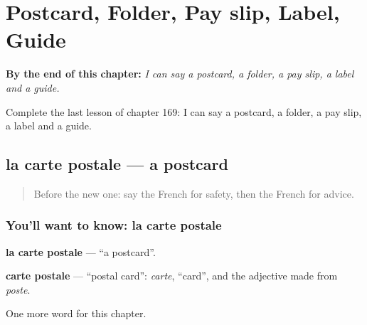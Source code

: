 
\chapter{Postcard, Folder, Pay slip, Label, Guide}
\label{ch:fr-postcard-folder-pay-slip-label-guide}

\begin{chapteropening}
\textbf{By the end of this chapter:} \emph{I can say a postcard, a folder, a pay slip, a label and a guide.}

Complete the last lesson of chapter 169: I can say a postcard, a folder, a pay slip, a label and a guide.
\end{chapteropening}

\section[la carte postale]{la carte postale — a postcard}

\label{lesson:FR-C169-carte-postale}



\begin{quote}
Before the new one: say the French for safety, then the French for advice.
\end{quote}

\subsection*{You'll want to know: la carte postale}
\textbf{la carte postale} — \textquotedblleft{}a postcard\textquotedblright{}.

\begin{cousinweb}
\textbf{carte postale} — \textquotedblleft{}postal card\textquotedblright{}: \emph{carte}, \textquotedblleft{}card\textquotedblright{}, and the adjective made from \emph{poste}.
\end{cousinweb}

\begin{grammarlens}[title={What you've built}]
One more word for this chapter.
\end{grammarlens}

